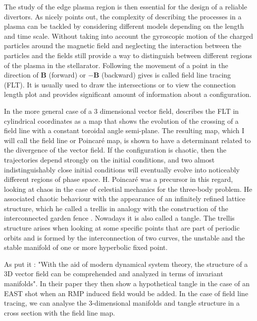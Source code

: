 The study of the edge plasma region is then essential for the design of a reliable divertors. As \cite{imbert-gerard_introduction_2020} nicely points out, the complexity of describing the processes in a plasma can be tackled by considering different models depending on the length and time scale. Without taking into account the gyroscopic motion of the charged particles around the magnetic field and neglecting the interaction between the particles and the fields still provide a way to distinguish between different regions of the plasma in the stellarator. Following the movement of a point in the direction of $\textbf{B}$ (forward) or $-\textbf{B}$ (backward) gives is called field line tracing (FLT). It is usually used to draw the intersections or to view the connection length plot and provides significant amount of information about a configuration.

In the more general case of a 3 dimensional vector field, \cite{wei_invariant_2023} describes the FLT in cylindrical coordinates as a map that shows the evolution of the crossing of a field line with a constant toroidal angle semi-plane. The resulting map, which I will call the field line or Poincaré map,  is shown to have a determinant related to the divergence of the vector field. If the configuration is chaotic, then the trajectories depend strongly on the initial conditions, and two almost indistinguishably close initial conditions will eventually evolve into noticeably different regions of phase space. H. Poincaré was a precursor in this regard, looking at chaos in the case of celestial mechanics for the three-body problem. He associated chaotic behaviour with the appearance of an infinitely refined lattice structure, which he called a trellis in analogy with the construction of the interconnected garden fence \cite[Ch.33]{poincare_methodes_1892}. Nowadays it is also called a tangle. The trellis structure arises when looking at some specific points that are part of periodic orbits and is formed by the interconnection of two curves, the unstable and the stable manifold of one or more hyperbolic fixed point.

As \cite{wei_invariant_2023} put it : "With the aid of modern dynamical system theory, the structure of a 3D vector field can be comprehended and analyzed in terms of invariant manifolds". In their paper they then show a hypothetical tangle in the case of an EAST shot when an RMP induced field would be added. In the case of field line tracing, we can analyse the 3-dimensional manifolds and tangle structure in a cross section with the field line map.

